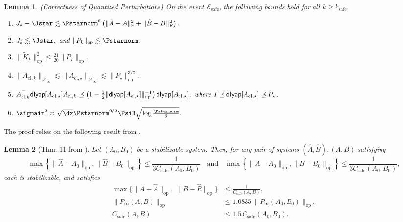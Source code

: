 \documentclass[11pt,journal,onecolumn]{IEEEtran}
\newtheorem{lemma}{Lemma}
\newcommand{\safe}{\mathrm{safe}}
\begin{document}
\begin{lemma} (Correctness of Quantized Perturbations)
    \label{lem:51}
    On the event $\mathcal{E}_{\text{safe}}$, the following bounds hold for all $k \geq k_{\safe}.$

    \begin{enumerate}
        \item $J_k - \Jstar \lesssim \Pstarnorm^8 \left(\|\tilde{A} - A\|_{\text{F}}^2 + \|\tilde{B} - B\|_{\text{F}}^2\right).$

        \item $J_k \lesssim \Jstar, \text{ \textit{and} } \|P_k\|_{\mathrm{op}} \lesssim \Pstarnorm.$

        \item $\|\tilde{K}_k\|_{\mathrm{op}}^2 \leq \frac{21}{20} \|P_\star\|_{\mathrm{op}}.$

        \item $\|A_{\mathrm{cl},k}\|_{\mathcal{H}_\infty} \lesssim \|A_{\mathrm{cl},\star}\|_{\mathcal{H}_\infty} \lesssim \|P_\star\|_{\mathrm{op}}^{3/2}.$

        \item $A_{\text{cl},k}^\top \mathsf{dlyap}[A_{\text{cl},\star}] A_{\text{cl},k} \preceq \left(1 - \frac{1}{2}\|\mathsf{dlyap}[A_{\text{cl},\star}]\|_{\mathrm{op}}^{-1}\right)\mathsf{dlyap}[A_{\text{cl},\star}], \text{ \textit{where} } I \preceq \mathsf{dlyap}[A_{\text{cl},\star}] \preceq P_\star$. 

        \item $\sigmain^2 \asymp \sqrt{\dx}\Pstarnorm^{9/2} \PsiB \sqrt{\log \frac{\Pstarnorm}{\delta}}.$
    \end{enumerate}
\end{lemma}

The proof relies on the following result from \cite{simchowitz20a}.

\begin{lemma}[Thm. 11 from \cite{simchowitz20a}]
    \label{lem:11}
    Let $(A_0, B_0)$ be a stabilizable system. Then, for any pair of systems $(\widehat{A}, \widehat{B}), (A, B)$ satisfying
    \[
        \max \left \{ \| \widehat{A} - A_0 \|_{\mathrm{op}}, \| \widehat{B} - B_0 \|_{\mathrm{op}} \right\} \le \frac{1}{3C_{\text{safe}}(A_0, B_0)}
        \quad \text{and} \quad
        \max \left \{ \| A - A_0 \|_{\mathrm{op}}, \| B - B_0 \|_{\mathrm{op}} \right\} \le \frac{1}{3C_{\text{safe}}(A_0, B_0)},
    \]
    each is stabilizable, and satisfies
    \begin{align}
        \max\{\|A - \widehat{A}\|_{\mathrm{op}},\; \|B - \widehat{B}\|_{\mathrm{op}}\} &\le \frac{1}{C_{\text{safe}}(A, B)}, \label{eq:thm11-safe} \\
        \|P_\infty(A, B)\|_{\mathrm{op}} &\le 1.0835\, \|P_\infty(A_0, B_0)\|_{\mathrm{op}}, \label{eq:thm11-P} \\
        C_\safe(A, B) &\le 1.5\, C_\safe(A_0, B_0). \label{eq:thm11-Csafe}
    \end{align}
\end{lemma}
\end{document}

